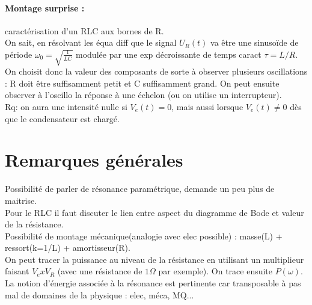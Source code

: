 \documentclass[12pt,prb,aps,epsf]{report}
\begin{document}
\paragraph{Montage surprise :} caractérisation d'un RLC aux bornes de R.\\
On sait, en résolvant les équa diff que le signal $U_R(t)$ va être une sinusoïde de période $\omega_0=\sqrt{\frac{1}{LC}}$ modulée par une exp décroissante de temps caract $\tau = L/R$. On choisit donc la valeur des composants de sorte à observer plusieurs oscillations : R doit être suffisamment petit et C suffisamment grand. On peut ensuite observer à l'oscillo la réponse à une échelon (ou on utilise un interrupteur).\\
Rq: on aura une intensité nulle si $V_e(t)=0$, mais aussi lorsque $V_e(t)\neq0$ dès que le condensateur est chargé.\\

\section{Remarques générales}
Possibilité de parler de résonance paramétrique, demande un peu plus de maitrise.\\
Pour le RLC il faut discuter le lien entre aspect du diagramme de Bode et valeur de la résistance.\\
Possibilité de montage mécanique(analogie avec elec possible) : masse(L) + ressort(k=1/L) + amortisseur(R).\\
On peut tracer la puissance au niveau de la résistance en utilisant un multiplieur faisant $V_e x V_R$ (avec une résistance de $1\Omega$ par exemple). On trace ensuite $P(\omega)$.\\
La notion d'énergie associée à la résonance est pertinente car transposable à pas mal de domaines de la physique : elec, méca, MQ...
\end{document}
